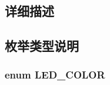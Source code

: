 \subsection{详细描述}


\subsection{枚举类型说明}
\subsubsection[{\texorpdfstring{L\+E\+D\+\_\+\+C\+O\+L\+OR}{LED_COLOR}}]{\setlength{\rightskip}{0pt plus 5cm}enum {\bf L\+E\+D\+\_\+\+C\+O\+L\+OR}}\hypertarget{group__led__driver_ga1f3289eeddfbcff1515a3786dc0518fa}{}\label{group__led__driver_ga1f3289eeddfbcff1515a3786dc0518fa}
